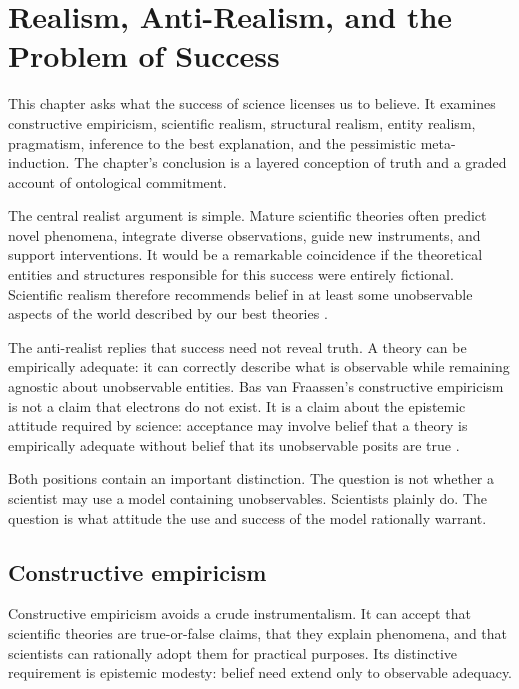 \chapter{Realism, Anti-Realism, and the Problem of Success}
\label{ch:realism}

\begin{chapterguide}
This chapter asks what the success of science licenses us to believe. It
examines constructive empiricism, scientific realism, structural realism,
entity realism, pragmatism, inference to the best explanation, and the
pessimistic meta-induction. The chapter's conclusion is a layered conception of
truth and a graded account of ontological commitment.
\end{chapterguide}

The central realist argument is simple. Mature scientific theories often
predict novel phenomena, integrate diverse observations, guide new instruments,
and support interventions. It would be a remarkable coincidence if the
theoretical entities and structures responsible for this success were entirely
fictional. Scientific realism therefore recommends belief in at least some
unobservable aspects of the world described by our best theories
\citep{chakravartty2007}.

The anti-realist replies that success need not reveal truth. A theory can be
empirically adequate: it can correctly describe what is observable while
remaining agnostic about unobservable entities. Bas van Fraassen's constructive
empiricism is not a claim that electrons do not exist. It is a claim about the
epistemic attitude required by science: acceptance may involve belief that a
theory is empirically adequate without belief that its unobservable posits are
true \citep{vanfraassen1980}.

Both positions contain an important distinction. The question is not whether a
scientist may use a model containing unobservables. Scientists plainly do.
The question is what attitude the use and success of the model rationally
warrant.

\section{Constructive empiricism}

Constructive empiricism avoids a crude instrumentalism. It can accept that
scientific theories are true-or-false claims, that they explain phenomena, and
that scientists can rationally adopt them for practical purposes. Its
distinctive requirement is epistemic modesty: belief need extend only to
observable adequacy.

